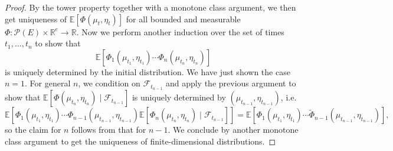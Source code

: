 \documentclass[10pt,a4paper]{amsart}
\begin{document}
\begin{proof}
By the tower property together with a monotone class argument, we then get
uniqueness of $\mathbb{E} [\Phi (\mu_t, \eta_t)]$ for all bounded and
measurable $\Phi : \mathcal{P} (E) \times \mathbb{R}^e \rightarrow
\mathbb{R}$. Now we perform another induction over the set of times $t_1,
\ldots, t_n$ to show that
\[ \mathbb{E} [\Phi_1 (\mu_{t_1}, \eta_{t_1}) \cdots \Phi_n (\mu_{t_n},
   \eta_{t_n})] \]
is uniquely determined by the initial distribution. We have just shown the
case $n = 1$. For general $n$, we condition on $\mathcal{F}_{t_{n - 1}}$ and
apply the previous argument to show that $\mathbb{E} [\Phi (\mu_{t_n},
\eta_{t_n}) \mid\mathcal{F}_{t_{n - 1}}]$ is uniquely determined by $ (\mu_{t_{n
- 1}}, \eta_{t_{n - 1}})$, i.e.
\[ \mathbb{E} [\Phi_1 (\mu_{t_1}, \eta_{t_1}) \cdots \Phi_{n - 1} (\mu_{t_{n -
   1}}, \eta_{t_{n - 1}}) \mathbb{E} [\Phi_n (\mu_{t_n}, \eta_{t_n})
   \mid\mathcal{F}_{t_{n - 1}}]] =\mathbb{E} [\Phi_1 (\mu_{t_1}, \eta_{t_1})
   \cdots \tilde{\Phi}_{n - 1} (\mu_{t_{n - 1}}, \eta_{t_{n - 1}})], \]
so the claim for $n$ follows from that for $n-1$. We conclude by another monotone class argument
to get the uniqueness of finite-dimensional distributions.
\end{proof}
\end{document}
